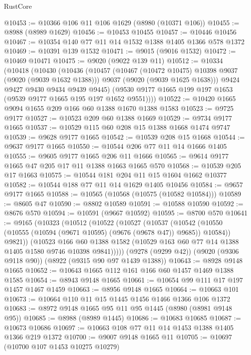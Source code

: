 \begin{lexlean}{RustCore}
\begin{coremodule}
@10453 := @10366 @106 @11 @106 @1629 (@8980 (@10371 @106))
@10455 := @8988 (@8989 @1629)
@10456 := @10453 @10455
@10457 := @10446 @10456
@10467 := @10354 @140 @77 @11 @14 @1532 @1388 @1405 @1366 @578 @1372
@10469 := @10391 @139 @1532
@10471 := @9015 (@9016 @1532)
@10472 := @10469 @10471
@10475 := @9020 (@9022 @139 @11)
@10512 := @10334
    (@10418
      (@10430
        (@10436
          (@10457
            (@10467 (@10472 @10475) @10398 @9037 (@9020 (@9039 @1632 @1388)))
            @9037
            (@9020 (@9039 @1625 @1638)))
          @9424
          @9427
          @9430
          @9434
          @9439
          @9445)
        (@9530 @9177 @1665 @199 @197 @1653 (@9539 @9177 @1665 @195 @197 @1652 @9551))))
@10522 := @10420 @1665 @9094 @1655 @209 @166 @60 @1388 @1670 @1388 @1583
@10523 := @9725 @9177
@10527 := @10523 @209 @60 @1388 @1669
@10529 := @9734 @9177 @1665
@10537 := @10529 @115 @60 @208 @15 @1388 @1668 @1474 @9747
@10539 := @9628 @9177 @1665
@10542 := @10539 @208 @15 @1668
@10544 := @9637 @9177 @1665
@10550 := @10544 @206 @77 @11 @14 @1666 @1405
@10555 := @9605 @9177 @1665 @206 @11 @1666
@10565 := @9614 @9177 @1665 @47 @205 @17 @11 @1388 @1663 @1665 @570
@10568 := @10539 @205 @17 @1663
@10575 := @10544 @181 @204 @11 @15 @1604 @1662 @10377
@10582 := @10544 @188 @77 @11 @14 @1629 @1405 @10456
@10584 := @9657 @9177 @1665
@10588 := @10565 (@10568 (@10575 (@10582 @10584)))
@10589 := @8605 @47
@10590 := @8802 @10589
@10591 := @10588 @10590
@10592 := @8676 @570
@10594 := @10591 (@9667 @10592)
@10595 := @8700 @570
@10641 := @9165
    (@10323
      (@10512
        (@10522
          (@10527
            (@10537
              (@10542 (@10550 (@10555 (@10594 (@9671 @10595) (@9676 (@9678 @47)) @9685)) @10584))
              @9821))
          (@10523
            @166
            @60
            @1388
            @1582
            (@10529 @163 @60 @77 @14 @1388 @1405 @1580 @9746 @10398 @9841)))))
    (@9278 (@9299 @42))
    (@9020 (@9306 @9118 @90))
    (@8922 (@9315 @90 @97 @1439 @1388))
@10643 := @8928 @9148 @1665
@10652 := @10643 @1665 @112 @161 @166 @60 @1457 @1469 @1388 @1585
@10654 := @8943 @9148 @1665
@10661 := @10654 @99 @111 @17 @197 @1457 @1467 @1459
@10663 := @8956 @9148 @1665
@10664 := @10663 @101
@10673 := @10664 @110 @11 @15 @1445 @1456 @1466 @1366 @106 @1372
@10683 := @8972 @9148 @1665 @95 @11 @95 @1445 (@8980 (@8981 @9148 @95))
@10685 := @8988 (@8989 @1445)
@10686 := @10683 @10685
@10687 := @10673 @10686
@10697 := @10663 @108 @77 @11 @14 @1453 @1388 @1405 @1366 @219 @1372
@10700 := @9007 @9148 @1665 @11
@10705 := @10697 (@10700 @107 @1453 @10275 @10279)

\end{coremodule}
\end{lexlean}
